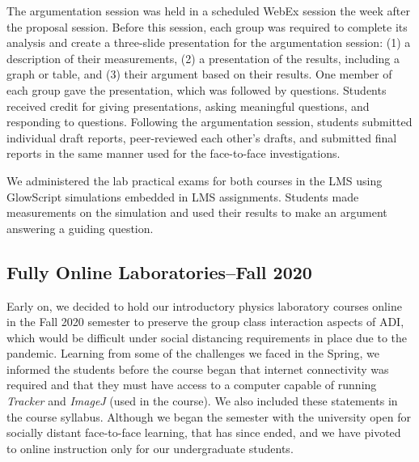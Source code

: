 \documentclass[aip, numerical, preprint]{revtex4-2}
\begin{document}
The argumentation session was held in a scheduled WebEx session
the week after the proposal session. Before this session, each group was required to complete
its analysis and create a three-slide presentation for the argumentation session: (1) a description of 
their measurements, (2) a presentation of the
results, including a graph or table, and (3) their argument based on their
results.  One member of each group gave the presentation, which was followed by
questions. Students received credit for giving presentations, asking meaningful questions, and
responding to questions.  Following the argumentation session, students submitted individual
draft reports, peer-reviewed each other's drafts, and submitted final reports in the same
manner used for the face-to-face investigations.

We administered the lab practical exams for both courses in the LMS using GlowScript simulations
embedded in LMS assignments. Students made measurements on the simulation and used their
results to make an argument answering a guiding question.

\subsection{Fully Online Laboratories--Fall 2020}

Early on, we decided to hold our introductory physics laboratory courses online in the Fall
2020 semester to preserve the group class interaction aspects of ADI, which would be
difficult under social distancing requirements in place due to the
pandemic.\citep{mclber20} Learning from some of the challenges we faced in the Spring, we
informed the students before the course began that internet connectivity was required and that
they must have access to a computer capable of running \emph{Tracker}\citep{bro2009} and 
\emph{ImageJ}\citep{schrasetal12} (used in the course). We also included these statements in the course
syllabus. Although we began the semester with the university open for socially distant
face-to-face learning, that has since ended, and we have pivoted to online instruction only for
our undergraduate students.
\end{document}
